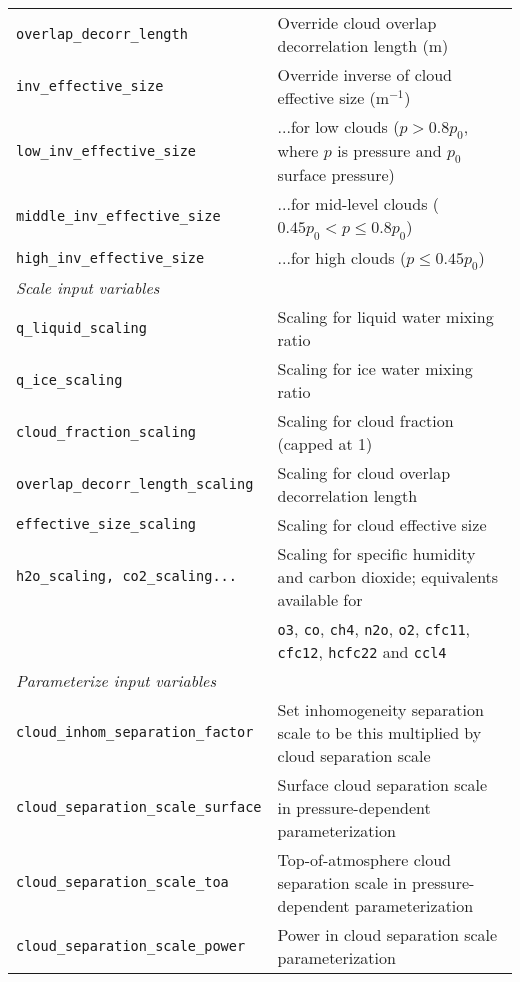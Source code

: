 \documentclass[a4,oneside]{article}
\def\codesize{\small}
\def\codetabsize{\footnotesize}
\def\code#1{{\codesize\texttt{#1}}}
\def\codetab#1{{\codetabsize\texttt{#1}}}
\begin{document}
\begin{center}
\begin{longtable}{ll}
\codetab{overlap\_decorr\_length} & Override cloud overlap decorrelation length (m)\\
\codetab{inv\_effective\_size} & Override inverse of cloud effective size (m$^{-1}$)\\
\codetab{low\_inv\_effective\_size} & ...for low clouds ($p>0.8p_0$, where $p$ is pressure and $p_0$ surface pressure)\\
\codetab{middle\_inv\_effective\_size} & ...for mid-level clouds ($0.45p_0< p\le 0.8p_0$)\\
\codetab{high\_inv\_effective\_size} & ...for high clouds ($p\le 0.45p_0$)\\
\hline
\multicolumn{2}{l}{\emph{Scale input variables}}\\
\codetab{q\_liquid\_scaling} & Scaling for liquid water mixing ratio\\
\codetab{q\_ice\_scaling} & Scaling for ice water mixing ratio\\
\codetab{cloud\_fraction\_scaling} & Scaling for cloud fraction (capped at 1)\\
\codetab{overlap\_decorr\_length\_scaling} & Scaling for cloud overlap decorrelation length\\
\codetab{effective\_size\_scaling} & Scaling for cloud effective size\\
\codetab{h2o\_scaling, co2\_scaling...} & Scaling for specific humidity and carbon dioxide; equivalents available for\\
& \code{o3}, \code{co}, \code{ch4},
\code{n2o}, \code{o2}, \code{cfc11}, \code{cfc12}, \code{hcfc22} and
\code{ccl4}\\
\hline
\multicolumn{2}{l}{\emph{Parameterize input variables}}\\
\codetab{cloud\_inhom\_separation\_factor} & Set inhomogeneity separation scale to be this multiplied by cloud separation scale\\
\codetab{cloud\_separation\_scale\_surface} & Surface cloud separation scale in pressure-dependent parameterization \\
\codetab{cloud\_separation\_scale\_toa} & Top-of-atmosphere cloud separation scale in pressure-dependent parameterization\\
\codetab{cloud\_separation\_scale\_power} & Power in cloud separation scale parameterization \\
\hline
\end{longtable}
\end{center}
\end{document}
